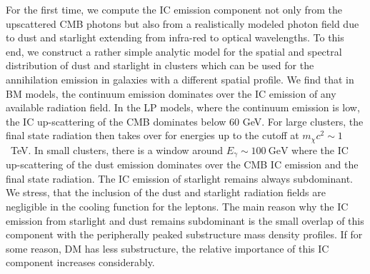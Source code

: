 \documentclass[10pt,aps,pra,reprint,amsmath,amsfonts,amssymb,showpacs,nofootinbib,floatfix]{revtex4-1}
\begin{document}
For the first time, we compute the IC emission component not only from
the upscattered CMB photons but also from a realistically modeled
photon field due to dust and starlight extending from infra-red to
optical wavelengths. To this end, we construct a rather simple
analytic model for the spatial and spectral distribution of dust and
starlight in clusters which can be used for the annihilation emission
in galaxies with a different spatial profile.  We find that in BM
models, the continuum emission dominates over the IC emission of any
available radiation field. In the LP models, where the continuum
emission is low, the IC up-scattering of the CMB dominates below 60
GeV. For large clusters, the final state radiation then takes over for
energies up to the cutoff at $m_\chi c^2 \sim 1$~TeV. In small
clusters, there is a window around $E_\gamma \sim 100~\mathrm{GeV}$
where the IC up-scattering of the dust emission dominates over the CMB
IC emission and the final state radiation. The IC emission of
starlight remains always subdominant.  We stress, that the inclusion
of the dust and starlight radiation fields are negligible in the
cooling function for the leptons.  The main reason why the IC emission
from starlight and dust remains subdominant is the small overlap of
this component with the peripherally peaked substructure mass density
profiles. If for some reason, DM has less substructure, the relative
importance of this IC component increases considerably.
\end{document}
